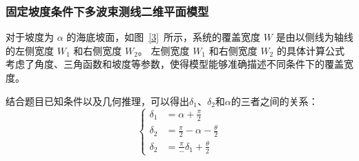 \documentclass[withoutpreface,bwprint]{cumcmthesis} %
\begin{document}
    \subsubsection{固定坡度条件下多波束测线二维平面模型}
    对于坡度为 $\alpha$ 的海底坡面，如图~\ref{3}~所示，系统的覆盖宽度 $W$ 是由以侧线为轴线的左侧宽度 $W_1$ 和右侧宽度 $W_2$。
    左侧宽度 $W_1$ 和右侧宽度 $W_2$ 的具体计算公式考虑了角度、三角函数和坡度等参数，使得模型能够准确描述不同条件下的覆盖宽度。
    
    结合题目已知条件以及几何推理，可以得出$\delta_1$、$\delta_2$和$\alpha$的三者之间的关系：
    \begin{equation}
        \left\{
        \begin{aligned}
            \delta_1 &= \alpha + \frac{\pi}{2} \\
            \delta_2 &= \frac{\pi}{2} - \alpha - \frac{\theta}{2} \\
            \delta_2 &= \frac{\pi} - \delta_1 + \frac{\theta}{2}
        \end{aligned}
        \right.
    \end{equation}
\end{document}
